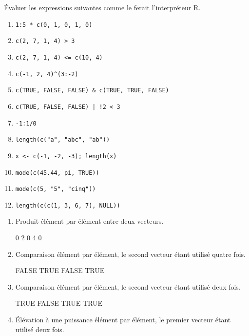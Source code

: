 \begin{exercice}
  Évaluer les expressions suivantes comme le ferait l'interpréteur R.
  \begin{enumerate}
  \item \verb|1:5 * c(0, 1, 0, 1, 0)|
  \item \verb|c(2, 7, 1, 4) > 3|
  \item \verb|c(2, 7, 1, 4) <= c(10, 4)|
  \item \verb|c(-1, 2, 4)^(3:-2)|
  \item \verb|c(TRUE, FALSE, FALSE) & c(TRUE, TRUE, FALSE)|
  \item \verb=c(TRUE, FALSE, FALSE) | !2 < 3=
  \item \verb|-1:1/0|
  \item \verb|length(c("a", "abc", "ab"))|
  \item \verb|x <- c(-1, -2, -3); length(x)|
  \item \verb|mode(c(45.44, pi, TRUE))|
  \item \verb|mode(c(5, "5", "cinq"))|
  \item \verb|length(c(c(1, 3, 6, 7), NULL))|
  \end{enumerate}
  \begin{sol}
    \begin{enumerate}
    \item Produit élément par élément entre deux vecteurs.
\begin{Schunk}
\begin{Soutput}
[1] 0 2 0 4 0
\end{Soutput}
\end{Schunk}
     \item Comparaison élément par élément, le second vecteur étant
       utilisé quatre fois.
\begin{Schunk}
\begin{Soutput}
[1] FALSE  TRUE FALSE  TRUE
\end{Soutput}
\end{Schunk}
     \item Comparaison élément par élément, le second vecteur étant
       utilisé deux fois.
\begin{Schunk}
\begin{Soutput}
[1]  TRUE FALSE  TRUE  TRUE
\end{Soutput}
\end{Schunk}
     \item Élévation à une puissance élément par élément, le premier
       vecteur étant utilisé deux fois.
\begin{Schunk}

\end{Schunk}
\end{enumerate}
\end{sol}
\end{exercice}
